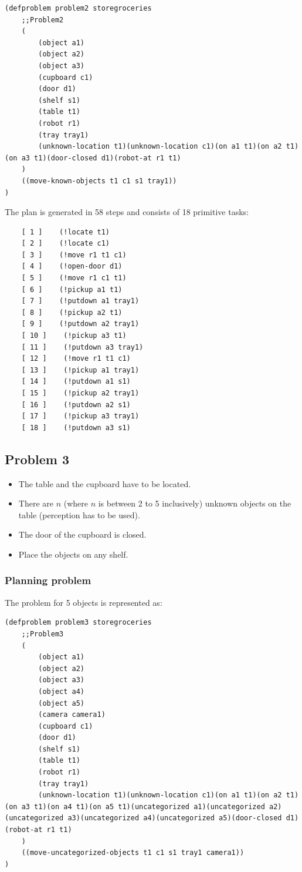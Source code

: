 \documentclass[paper=a4, fontsize=11pt]{scrartcl}
\begin{document}
	\begin{lstlisting}
(defproblem problem2 storegroceries
	;;Problem2
	(
		(object a1)
		(object a2)
		(object a3)
		(cupboard c1)
		(door d1)
		(shelf s1)
		(table t1)
		(robot r1)
		(tray tray1)
		(unknown-location t1)(unknown-location c1)(on a1 t1)(on a2 t1)(on a3 t1)(door-closed d1)(robot-at r1 t1)
	)
	((move-known-objects t1 c1 s1 tray1))
)
	\end{lstlisting}

	\vspace{5mm}

	The plan is generated in 58 steps and consists of 18 primitive tasks: \\

	\begin{lstlisting}
	[ 1 ]    (!locate t1)
	[ 2 ]    (!locate c1)
	[ 3 ]    (!move r1 t1 c1)
	[ 4 ]    (!open-door d1)
	[ 5 ]    (!move r1 c1 t1)
	[ 6 ]    (!pickup a1 t1)
	[ 7 ]    (!putdown a1 tray1)
	[ 8 ]    (!pickup a2 t1)
	[ 9 ]    (!putdown a2 tray1)
	[ 10 ]    (!pickup a3 t1)
	[ 11 ]    (!putdown a3 tray1)
	[ 12 ]    (!move r1 t1 c1)
	[ 13 ]    (!pickup a1 tray1)
	[ 14 ]    (!putdown a1 s1)
	[ 15 ]    (!pickup a2 tray1)
	[ 16 ]    (!putdown a2 s1)
	[ 17 ]    (!pickup a3 tray1)
	[ 18 ]    (!putdown a3 s1)
	\end{lstlisting}

	\subsection{Problem 3}

		\begin{itemize}
			\item The table and the cupboard have to be located.
			\item There are $n$ (where $n$ is between 2 to 5 inclusively) unknown objects on the table (perception has to be used).
			\item The door of the cupboard is closed.
			\item Place the objects on any shelf.
		\end{itemize}

	\subsubsection*{Planning problem}

	The problem for 5 objects is represented as: \\

	\begin{lstlisting}
(defproblem problem3 storegroceries
	;;Problem3
	(
		(object a1)
		(object a2)
		(object a3)
		(object a4)
		(object a5)
		(camera camera1)
		(cupboard c1)
		(door d1)
		(shelf s1)
		(table t1)
		(robot r1)
		(tray tray1)
		(unknown-location t1)(unknown-location c1)(on a1 t1)(on a2 t1)(on a3 t1)(on a4 t1)(on a5 t1)(uncategorized a1)(uncategorized a2)(uncategorized a3)(uncategorized a4)(uncategorized a5)(door-closed d1)(robot-at r1 t1)
	)
	((move-uncategorized-objects t1 c1 s1 tray1 camera1))
)
	\end{lstlisting}
\end{document}
